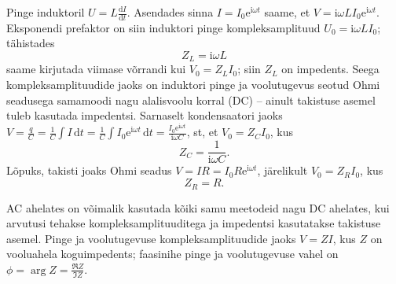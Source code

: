 \documentclass[a4paper,11pt,twocolumn]{article}
\newcommand*\iu{\mathrm{i}}
\begin{document}
Pinge induktoril $U=L \frac{\mathrm{d}I}{\mathrm{d}t}$.
Asendades sinna $I=I_0 \mathrm{e}^{\iu \omega t}$ saame, et $V=\iu \omega L I_0 \mathrm{e}^{\iu \omega t}$. Eksponendi prefaktor on siin induktori pinge kompleksamplituud $U_0=\iu \omega L I_0$; tähistades
\[
Z_L=\iu \omega L
\]
saame kirjutada viimase võrrandi kui $V_0=Z_L I_0$; siin $Z_L$ on impedents. Seega kompleksamplituudide jaoks on induktori pinge ja voolutugevus seotud Ohmi seadusega samamoodi nagu alalisvoolu korral (DC) -- ainult takistuse asemel tuleb kasutada impedentsi.
Sarnaselt kondensaatori jaoks $V=\frac{q}{C}=\frac{1}{C} \int I \, \mathrm{d}t=\frac{1}{C} \int I_0 \mathrm{e}^{\iu \omega t} \, \mathrm{d}t=\frac{I_0 \mathrm{e}^{\iu \omega t}}{\iu \omega C}$, st, et $V_0=Z_C I_0$, kus
\[
Z_C=\frac{1}{\iu \omega C}
.\]
Lõpuks, takisti joaks Ohmi seadus $V=IR=I_0 R \mathrm{e}^{\iu \omega t}$, järelikult $V_0=Z_R I_0$, kus
\[
Z_R=R
.\]

AC ahelates on võimalik kasutada kõiki samu meetodeid nagu DC ahelates, kui arvutusi tehakse kompleksamplituuditega ja impedentsi kasutatakse takistuse asemel. Pinge ja voolutugevuse kompleksamplituudide jaoks $V=Z I$, kus $Z$ on vooluahela koguimpedents; faasinihe pinge ja voolutugevuse vahel on $\phi=\arg Z=\frac{\Re Z}{\Im Z}$.
\end{document}
